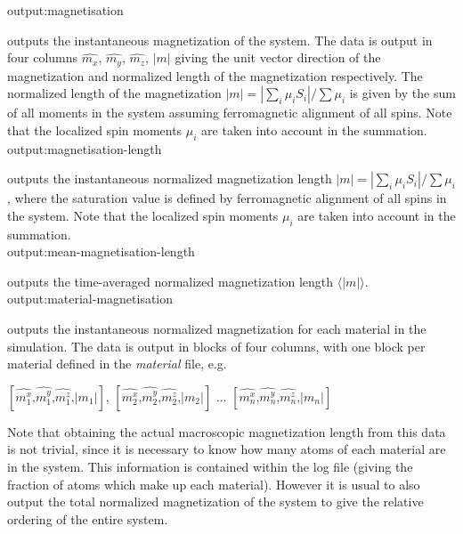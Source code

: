 {\zicf output:magnetisation} outputs the instantaneous magnetization of the system. The data is output in four columns $\hat{m_x}$, $\hat{m_y}$, $\hat{m_z}$, $|m|$ giving the unit vector direction of the magnetization and normalized length of the magnetization respectively. The normalized length of the magnetization $|m| = |\sum_i \mu_i S_i| / \sum \mu_i$ is given by the sum of all moments in the system assuming ferromagnetic alignment of all spins. Note that the localized spin moments $\mu_i$ are taken into account in the summation.\\

{\zicf output:magnetisation-length} outputs the instantaneous normalized magnetization length $|m| = |\sum_i \mu_i S_i| / \sum \mu_i$, where the saturation value is defined by ferromagnetic alignment of all spins in the system. Note that the localized spin moments $\mu_i$ are taken into account in the summation.\\

{\zicf output:mean-magnetisation-length} outputs the time-averaged normalized magnetization length $\langle|m|\rangle$.\\

{\zicf output:material-magnetisation} outputs the instantaneous normalized magnetization for each material in the simulation. The data is output in blocks of four columns, with one block per material defined in the \textit{material} file, e.g.

\begin{center}
$\left[ \hat{m_1^x} \textrm{,} \hat{m_1^y} \textrm{,} \hat{m_1^z} \textrm{,} |m_1| \right]$,
$\left[ \hat{m_2^x} \textrm{,} \hat{m_2^y} \textrm{,} \hat{m_2^z} \textrm{,} |m_2| \right]$ ...
$\left[ \hat{m_n^x} \textrm{,} \hat{m_n^y} \textrm{,} \hat{m_n^z} \textrm{,} |m_n| \right]$
\end{center}

Note that obtaining the actual macroscopic magnetization length from this data is not trivial, since it is necessary to know how many atoms of each material are in the system. This information is contained within the log file (giving the fraction of atoms which make up each material). However it is usual to also output the total normalized magnetization of the system to give the relative ordering of the entire system.\\

